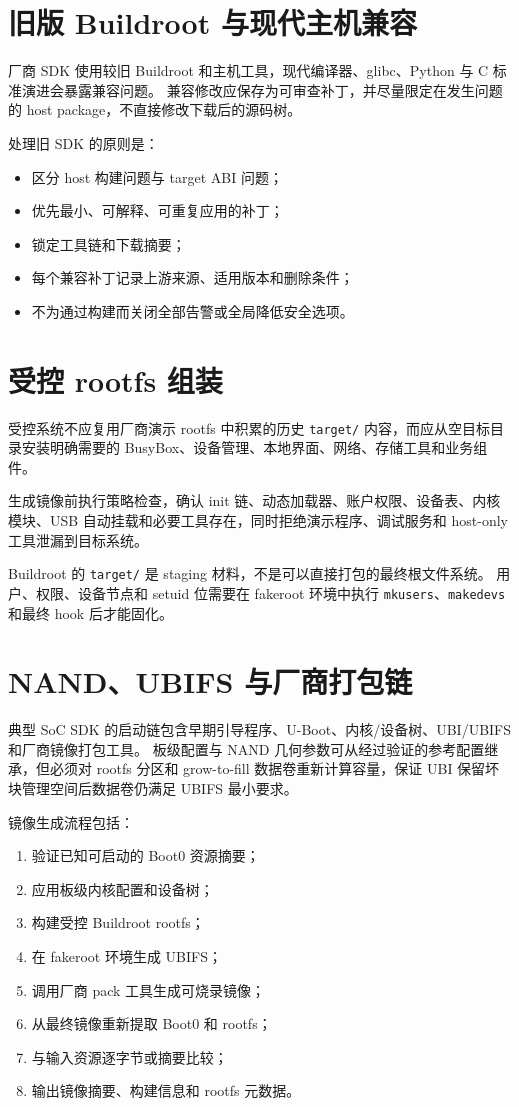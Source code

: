 \section{旧版 Buildroot 与现代主机兼容}

厂商 SDK 使用较旧 Buildroot 和主机工具，现代编译器、glibc、Python 与 C 标准演进会暴露兼容问题。
兼容修改应保存为可审查补丁，并尽量限定在发生问题的 host package，不直接修改下载后的源码树。

处理旧 SDK 的原则是：
\begin{itemize}
  \item 区分 host 构建问题与 target ABI 问题；
  \item 优先最小、可解释、可重复应用的补丁；
  \item 锁定工具链和下载摘要；
  \item 每个兼容补丁记录上游来源、适用版本和删除条件；
  \item 不为通过构建而关闭全部告警或全局降低安全选项。
\end{itemize}

\section{受控 rootfs 组装}

受控系统不应复用厂商演示 rootfs 中积累的历史 \texttt{target/} 内容，而应从空目标目录安装明确需要的 BusyBox、设备管理、本地界面、网络、存储工具和业务组件。

生成镜像前执行策略检查，确认 init 链、动态加载器、账户权限、设备表、内核模块、USB 自动挂载和必要工具存在，同时拒绝演示程序、调试服务和 host-only 工具泄漏到目标系统。

Buildroot 的 \texttt{target/} 是 staging 材料，不是可以直接打包的最终根文件系统。
用户、权限、设备节点和 setuid 位需要在 fakeroot 环境中执行 \texttt{mkusers}、\texttt{makedevs} 和最终 hook 后才能固化。

\section{NAND、UBIFS 与厂商打包链}

典型 SoC SDK 的启动链包含早期引导程序、U-Boot、内核/设备树、UBI/UBIFS 和厂商镜像打包工具。
板级配置与 NAND 几何参数可从经过验证的参考配置继承，但必须对 rootfs 分区和 grow-to-fill 数据卷重新计算容量，保证 UBI 保留坏块管理空间后数据卷仍满足 UBIFS 最小要求。

镜像生成流程包括：
\begin{enumerate}
  \item 验证已知可启动的 Boot0 资源摘要；
  \item 应用板级内核配置和设备树；
  \item 构建受控 Buildroot rootfs；
  \item 在 fakeroot 环境生成 UBIFS；
  \item 调用厂商 pack 工具生成可烧录镜像；
  \item 从最终镜像重新提取 Boot0 和 rootfs；
  \item 与输入资源逐字节或摘要比较；
  \item 输出镜像摘要、构建信息和 rootfs 元数据。
\end{enumerate}

